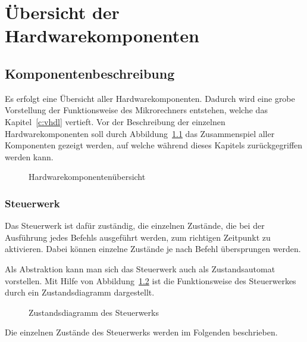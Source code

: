 \chapter{Übersicht der Hardwarekomponenten}
\label{c:hardware}
\section{Komponentenbeschreibung}
Es erfolgt eine Übersicht aller Hardwarekomponenten.  Dadurch wird eine grobe
Vorstellung der Funktionsweise des Mikrorechners entstehen, welche das
Kapitel~\ref{c:vhdl} vertieft. Vor der Beschreibung der einzelnen
Hardwarekomponenten soll durch Abbildung~\ref{pic:hardware_overview} das
Zusammenspiel aller Komponenten gezeigt werden, auf welche während dieses
Kapitels zurückgegriffen werden kann.
\begin{figure}[hb]
\centering
\def\svgwidth{\columnwidth}

\caption{Hardwarekomponentenübersicht}
\label{pic:hardware_overview}
\end{figure}
\pagebreak
\subsection{Steuerwerk}
\label{s:control}
Das Steuerwerk ist dafür zuständig, die einzelnen Zustände, die bei der
Ausführung jedes Befehls ausgeführt werden, zum richtigen Zeitpunkt zu
aktivieren. Dabei können einzelne Zustände je nach Befehl übersprungen werden.

Als Abstraktion kann man sich das Steuerwerk auch als Zustandsautomat
vorstellen. Mit Hilfe von Abbildung~\ref{pic:zustandsdiagramm} ist die
Funktionsweise des Steuerwerkes durch ein Zustandsdiagramm dargestellt.

\begin{figure}[htb]
\centering
{}
\caption{Zustandsdiagramm des Steuerwerks}
\label{pic:zustandsdiagramm}
\end{figure}
\pagebreak
Die einzelnen Zustände des Steuerwerks werden im Folgenden beschrieben.
